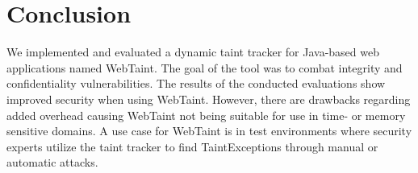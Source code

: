 \chapter{Conclusion}
\label{Conclusion}
We implemented and evaluated a dynamic taint tracker for Java-based web applications named WebTaint. The goal of the tool was to combat integrity and confidentiality vulnerabilities. The results of the conducted evaluations show improved security when using WebTaint. However, there are drawbacks regarding added overhead causing WebTaint not being suitable for use in time- or memory sensitive domains. A use case for WebTaint is in test environments where security experts utilize the taint tracker to find TaintExceptions through manual or automatic attacks.